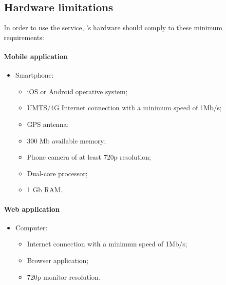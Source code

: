 \documentclass[../../../rasd.tex]{subfiles}
\begin{document}
\subsection{Hardware limitations\label{sect:3.4.2}}


In order to use the service, ’s hardware should comply to these minimum requirements:

\paragraph{Mobile application}
\begin{itemize}
	\item Smartphone:
		\begin{itemize}
			\item iOS or Android operative system;
			\item UMTS/4G Internet connection with a minimum speed of 1Mb/s; 
			\item GPS antenna;
			\item 300 Mb available memory;
			\item Phone camera of at least 720p resolution;
			\item Dual-core processor;
			\item 1 Gb RAM.
		\end{itemize}
\end{itemize}

\paragraph{Web application}
\begin{itemize}
	\item Computer:
	\begin{itemize}
		\item Internet connection with a minimum speed of 1Mb/s; 
		\item Browser application;
		\item 720p monitor resolution.
	\end{itemize}
\end{itemize}
\end{document}
